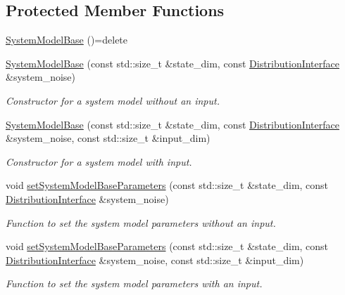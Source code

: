 \subsection*{Protected Member Functions}
\begin{DoxyCompactItemize}
\item 
\hyperlink{classrefill_1_1SystemModelBase_a047ffd2ad50367f6015e18c316892e7f}{System\+Model\+Base} ()=delete
\item 
\hyperlink{classrefill_1_1SystemModelBase_a08f44c52bb46c5e2eb28a22f28845685}{System\+Model\+Base} (const std\+::size\+\_\+t \&state\+\_\+dim, const \hyperlink{classrefill_1_1DistributionInterface}{Distribution\+Interface} \&system\+\_\+noise)
\begin{DoxyCompactList}\small\item\em Constructor for a system model without an input. \end{DoxyCompactList}\item 
\hyperlink{classrefill_1_1SystemModelBase_a06e615416890160ecdece6a3c7511b5c}{System\+Model\+Base} (const std\+::size\+\_\+t \&state\+\_\+dim, const \hyperlink{classrefill_1_1DistributionInterface}{Distribution\+Interface} \&system\+\_\+noise, const std\+::size\+\_\+t \&input\+\_\+dim)
\begin{DoxyCompactList}\small\item\em Constructor for a system model with input. \end{DoxyCompactList}\item 
void \hyperlink{classrefill_1_1SystemModelBase_ab6aeac2bb57bdc72db21a90005ab292f}{set\+System\+Model\+Base\+Parameters} (const std\+::size\+\_\+t \&state\+\_\+dim, const \hyperlink{classrefill_1_1DistributionInterface}{Distribution\+Interface} \&system\+\_\+noise)
\begin{DoxyCompactList}\small\item\em Function to set the system model parameters without an input. \end{DoxyCompactList}\item 
void \hyperlink{classrefill_1_1SystemModelBase_a6fcf6bb1b44bfd7ccd1c0f2f1d20d53b}{set\+System\+Model\+Base\+Parameters} (const std\+::size\+\_\+t \&state\+\_\+dim, const \hyperlink{classrefill_1_1DistributionInterface}{Distribution\+Interface} \&system\+\_\+noise, const std\+::size\+\_\+t \&input\+\_\+dim)
\begin{DoxyCompactList}\small\item\em Function to set the system model parameters with an input. \end{DoxyCompactList}\end{DoxyCompactItemize}


